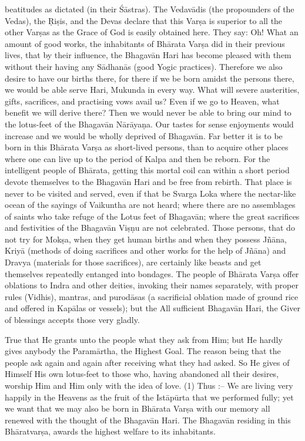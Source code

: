 beatitudes as dictated (in their \'S\=astras). The Vedav\=adis (the propounders of the Vedas), the \d{R}i\d{s}is, and the Devas declare that this Var\d{s}a is superior to all the other Var\d{s}as as the Grace of God is easily obtained here. They say: Oh! What an amount of good works, the inhabitants of Bh\=arata Var\d{s}a did in their previous lives, that by their influence, the Bhagav\=an Hari has become pleased with them without their having any S\=adhan\=as (good Yogic practices). Therefore we also desire to have our births there, for there if we be born amidst the persons there, we would be able serve Hari, Mukunda in every way. What will severe austerities, gifts, sacrifices, and practising vows avail us? Even if we go to Heaven, what benefit we will derive there? Then we would never be able to bring our mind to the lotus-feet of the Bhagav\=an N\=ar\=aya\d{n}a. Our tastes for sense enjoyments would increase and we would be wholly deprived of Bhagav\=an. Far better it is to be born in this Bh\=arata Var\d{s}a as short-lived persons, than to acquire other places where one can live up to the period of Kalpa and then be reborn. For the intelligent people of Bh\=arata, getting this mortal coil can within a short period devote themselves to the Bhagav\=an Hari and be free from rebirth. That place is never to be visited and served, even if that be Svarga Loka where the nectar-like ocean of the sayings of Vaikuntha are not heard; where there are no assemblages of saints who take refuge of the Lotus feet of Bhagav\=an; where the great sacrifices and festivities of the Bhagav\=an Vi\d{s}\d{n}u are not celebrated. Those persons, that do not try for Mok\d{s}a, when they get human births and when they possess J\~n\=ana, Kriy\=a (methods of doing sacrifices and other works for the help of J\~n\=ana) and Dravya (materials for those sacrifices), are certainly like beasts and get themselves repeatedly entanged into bondages. The people of Bh\=arata Var\d{s}a offer oblations to Indra and other deities, invoking their names separately, with proper rules (Vidhis), mantras, and purod\=asas (a sacrificial oblation made of ground rice and offered in Kap\=alas or vessels); but the All sufficient Bhagav\=an Hari, the Giver of blessings accepts those very gladly.

True that He grants unto the people what they ask from Him; but He hardly gives anybody the Param\=artha, the Highest Goal. The reason being that the people ask again and again after receiving what they had asked. So He gives of Himself His own lotus-feet to those who, having abandoned all their desires, worship Him and Him only with the idea of love. (1) Thus :-- We are living very happily in the Heavens as the fruit of the Ist\=ap\=urta that we performed fully; yet we want that we may also be born in Bh\=arata Var\d{s}a with our memory all renewed with the thought of the Bhagav\=an Hari. The Bhagav\=an residing in this Bh\=aratvar\d{s}a, awards the highest welfare to its inhabitants.

